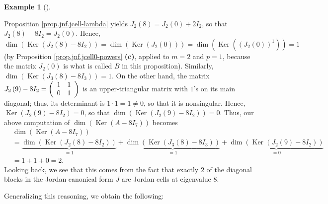 \documentclass[numbers=enddot,12pt,final,onecolumn,notitlepage]{scrartcl}%
\numberwithin{exer}{subsection}
\theoremstyle{definition}
\newtheorem{exam}[theo]{Example}
\newenvironment{example}[1][]
{\begin{exam}[#1]\begin{leftbar}}
{\end{leftbar}\end{exam}}
\begin{document}
\begin{example}
Proposition \ref{prop.jnf.jcell-lambda} yields $J_{2}\left(  8\right)
=J_{2}\left(  0\right)  +2I_{2}$, so that $J_{2}\left(  8\right)
-8I_{2}=J_{2}\left(  0\right)  $. Hence,%
\[
\dim\left(  \operatorname*{Ker}\left(  J_{2}\left(  8\right)  -8I_{2}\right)
\right)  =\dim\left(  \operatorname*{Ker}\left(  J_{2}\left(  0\right)
\right)  \right)  =\dim\left(  \operatorname*{Ker}\left(  \left(  J_{2}\left(
0\right)  \right)  ^{1}\right)  \right)  =1
\]
(by Proposition \ref{prop.jnf.jcell0-powers} \textbf{(c)}, applied to $m=2$
and $p=1$, because the matrix $J_{2}\left(  0\right)  $ is what is called $B$
in this proposition). Similarly, $\dim\left(  \operatorname*{Ker}\left(
J_{3}\left(  8\right)  -8I_{3}\right)  \right)  =1$. On the other hand, the
matrix $J_{2}\left(  9\right)  -8I_{2}=\left(
\begin{array}
[c]{cc}%
1 & 1\\
0 & 1
\end{array}
\right)  $ is an upper-triangular matrix with $1$'s on its main diagonal;
thus, its determinant is $1\cdot1=1\neq0$, so that it is nonsingular. Hence,
$\operatorname*{Ker}\left(  J_{2}\left(  9\right)  -8I_{2}\right)  =0$, so
that $\dim\left(  \operatorname*{Ker}\left(  J_{2}\left(  9\right)
-8I_{2}\right)  \right)  =0$. Thus, our above computation of $\dim\left(
\operatorname*{Ker}\left(  A-8I_{7}\right)  \right)  $ becomes%
\begin{align*}
&  \dim\left(  \operatorname*{Ker}\left(  A-8I_{7}\right)  \right) \\
&  =\underbrace{\dim\left(  \operatorname*{Ker}\left(  J_{2}\left(  8\right)
-8I_{2}\right)  \right)  }_{=1}+\underbrace{\dim\left(  \operatorname*{Ker}%
\left(  J_{3}\left(  8\right)  -8I_{3}\right)  \right)  }_{=1}%
+\underbrace{\dim\left(  \operatorname*{Ker}\left(  J_{2}\left(  9\right)
-8I_{2}\right)  \right)  }_{=0}\\
&  =1+1+0=2.
\end{align*}
Looking back, we see that this comes from the fact that exactly $2$ of the
diagonal blocks in the Jordan canonical form $J$ are Jordan cells at
eigenvalue $8$.
\end{example}

Generalizing this reasoning, we obtain the following:
\end{document}
